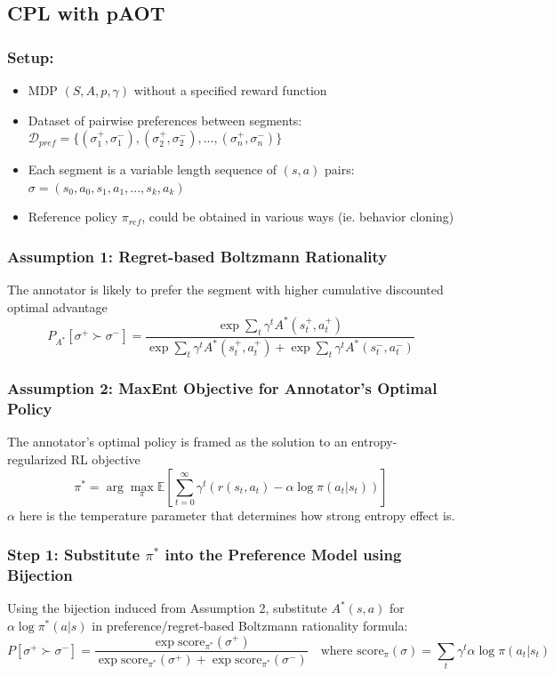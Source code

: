 \documentclass[11pt]{article}
\begin{document}


\subsection{CPL with pAOT}

\subsubsection*{Setup:}
\begin{itemize}
    \item MDP $(S,A,p,\gamma)$ without a specified reward function
    \item Dataset of pairwise preferences between segments: $\mathcal{D}_{pref} = \{(\sigma_1^+, \sigma_1^-), (\sigma_2^+, \sigma_2^-), ..., (\sigma_n^+, \sigma_n^-)\}$
    \item Each segment is a variable length sequence of $(s, a)$ pairs: $\sigma = (s_0, a_0, s_1, a_1, ..., s_k, a_k)$
    \item Reference policy $\pi_{ref}$, could be obtained in various ways (ie. behavior cloning)
\end{itemize}

\subsubsection*{Assumption 1: Regret-based Boltzmann Rationality}
The annotator is likely to prefer the segment with higher cumulative discounted optimal advantage
$$P_{A^*}[\sigma^+ \succ \sigma^-] = \frac{\exp \sum_t \gamma^t A^*(s_t^+, a_t^+)}{\exp \sum_t \gamma^t A^*(s_t^+, a_t^+) + \exp \sum_t \gamma^t A^*(s_t^-, a_t^-)}$$

\subsubsection*{Assumption 2: MaxEnt Objective for Annotator's Optimal Policy}
The annotator's optimal policy is framed as the solution to an entropy-regularized RL objective
$$\pi^* = \arg\max_\pi \mathbb{E} \left[ \sum_{t=0}^\infty \gamma^t (r(s_t, a_t) - \alpha \log \pi(a_t|s_t)) \right]$$
$\alpha$ here is the temperature parameter that determines how strong entropy effect is.\\

\subsubsection*{Step 1: Substitute $\pi^*$ into the Preference Model using Bijection}
Using the bijection induced from Assumption 2, substitute $A^*(s, a)$ for $\alpha \log \pi^*(a|s)$ in preference/regret-based Boltzmann rationality formula:
$$P[\sigma^+ \succ \sigma^-] = \frac{\exp \text{score}_{\pi^*}(\sigma^+)}{\exp \text{score}_{\pi^*}(\sigma^+) + \exp \text{score}_{\pi^*}(\sigma^-)} \quad \text{where } \text{score}_\pi(\sigma) = \sum_t \gamma^t \alpha \log \pi(a_t|s_t)$$
\end{document}

